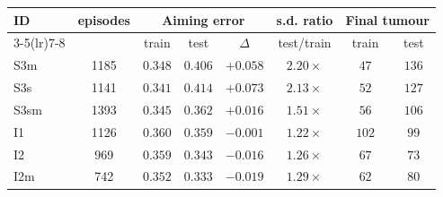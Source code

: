 \begin{tabular}{lccccccc}
  \toprule
  \textbf{ID} & \textbf{episodes}
  & \multicolumn{3}{c}{\textbf{Aiming error}}
  & \textbf{s.d. ratio}
  & \multicolumn{2}{c}{\textbf{Final tumour}} \\
  \cmidrule(lr){3-5}\cmidrule(lr){7-8}
  & & train & test & $\Delta$ & test/train & train & test \\
  \midrule
  S3m & 1185 & $0.348$ & $0.406$ & $+0.058$ & $2.20\times$ & $47$ & $136$ \\
  S3s & 1141 & $0.341$ & $0.414$ & $+0.073$ & $2.13\times$ & $52$ & $127$ \\
  S3sm & 1393 & $0.345$ & $0.362$ & $+0.016$ & $1.51\times$ & $56$ & $106$ \\
  \midrule
  I1 & 1126 & $0.360$ & $0.359$ & $-0.001$ & $1.22\times$ & $102$ & $99$ \\
  I2 & 969 & $0.359$ & $0.343$ & $-0.016$ & $1.26\times$ & $67$ & $73$ \\
  I2m & 742 & $0.352$ & $0.333$ & $-0.019$ & $1.29\times$ & $62$ & $80$ \\
  \bottomrule
\end{tabular}
